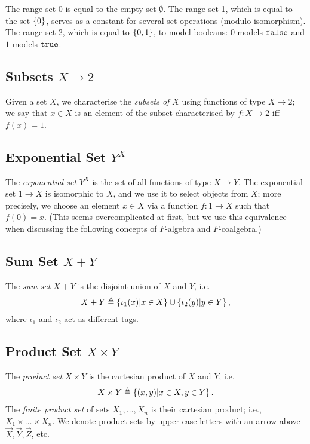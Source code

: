 The range set 0 is equal to the empty set $\emptyset$. 
The range set 1, which is equal to the set $\left\{0\right\}$, serves as a constant for several set operations (modulo isomorphism).
The range set 2, which is equal to $\left\{0,1\right\}$, to model booleans: 0 models $\mathtt{\texttt{false}}$ and $1$ models $\mathtt{\texttt{true}}$. 

\subsection{Subsets $X\rightarrow 2$}
Given a set $X$, we characterise the \emph{subsets of $X$} using functions of type $X\rightarrow 2$; we say that $x\in X$ is an element of the subset characterised by $f\colon X\rightarrow 2$ iff $f(x)=1$. 
 
\subsection{Exponential Set $Y^X$}
The \emph{exponential set} $Y^X$ is the set of all functions of type $X\rightarrow Y$. 
The exponential set $1\rightarrow X$ is isomorphic to $X$, and we use it to select objects from $X$; more precisely, we choose an element $x\in X$ via a function $f\colon 1\rightarrow X$ such that $f(0)=x$. (This seems overcomplicated at first, but we use this equivalence when discussing the following concepts of $F$-algebra and $F$-coalgebra.)

\subsection{Sum Set $X+Y$}
The \emph{sum set} $X + Y$ is the disjoint union of $X$ and $Y$, i.e. 
\begin{align*}
    X + Y\triangleq\left\{ \iota_1(x) |x\in X\right\} \cup \left\{\iota_2(y) | y\in Y\right\},
\end{align*}
where $\iota_1$ and $\iota_2$ act as different tags.
\subsection{Product Set $X\times Y$}
The \emph{product set} $X\times Y$ is the cartesian product of $X$ and $Y$, i.e. 
\begin{align*}
    X\times Y\triangleq\left\{(x,y)|x\in X, y\in Y\right\}.
\end{align*}
The \emph{finite product set} of sets $X_1, \ldots, X_n$ is their cartesian product; i.e., $X_1\times \ldots \times X_n$. We denote product sets by upper-case letters with an arrow above $\vec{X},\vec{Y}, \vec{Z}$, etc.

